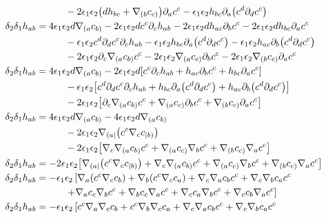 \begin{align*}
    &\quad\quad\quad-2\epsilon_1\epsilon_2\qty(dh_{bc}+\nabla_{(b}c_{c)})\partial_ac^c-\epsilon_1\epsilon_2h_{bc}\partial_a\qty(c^d\partial_dc^c)\\
    \delta_2\delta_1 h_{ab}&=4\epsilon_1 \epsilon_2d\nabla_{(a}c_{b)}-2\epsilon_1\epsilon_2dc^c\partial_ch_{ab}-2\epsilon_1\epsilon_2dh_{ac}\partial_bc^c-2\epsilon_1\epsilon_2dh_{bc}\partial_ac^c\\
    &\quad\quad\quad-\epsilon_1\epsilon_2c^d\partial_dc^c\partial_ch_{ab}-\epsilon_1\epsilon_2h_{bc}\partial_a\qty(c^d\partial_dc^c)-\epsilon_1\epsilon_2h_{ac}\partial_b\qty(c^d\partial_dc^c)\\
    &\quad\quad\quad-2\epsilon_1\epsilon_2\partial_c\nabla_{(a}c_{b)}c^c-2\epsilon_1\epsilon_2\nabla_{(a}c_{c)}\partial_bc^c-2\epsilon_1\epsilon_2\nabla_{(b}c_{c)}\partial_ac^c\\
    \delta_2\delta_1 h_{ab}&=4\epsilon_1 \epsilon_2d\nabla_{(a}c_{b)}-2\epsilon_1\epsilon_2d\qty[c^c\partial_ch_{ab}+h_{ac}\partial_bc^c+h_{bc}\partial_ac^c]\\
    &\quad\quad\quad-\epsilon_1\epsilon_2\qty[c^d\partial_dc^c\partial_ch_{ab}+h_{bc}\partial_a\qty(c^d\partial_dc^c)+h_{ac}\partial_b\qty(c^d\partial_dc^c)]\\
    &\quad\quad\quad-2\epsilon_1\epsilon_2\qty[\partial_c\nabla_{(a}c_{b)}c^c+\nabla_{(a}c_{c)}\partial_bc^c+\nabla_{(b}c_{c)}\partial_ac^c]\\
    \delta_2\delta_1 h_{ab}&=4\epsilon_1 \epsilon_2d\nabla_{(a}c_{b)}-4\epsilon_1\epsilon_2d\nabla_{(a}c_{b)}\\
    &\quad\quad\quad-2\epsilon_1\epsilon_2\nabla_{(a|}\qty(c^c\nabla_cc_{|b)})\\
    &\quad\quad\quad-2\epsilon_1\epsilon_2\qty[\nabla_c\nabla_{(a}c_{b)}c^c+\nabla_{(a}c_{c)}\nabla_bc^c+\nabla_{(b}c_{c)}\nabla_ac^c]\\
    \delta_2\delta_1 h_{ab}&=-2\epsilon_1\epsilon_2\qty[\nabla_{(a|}\qty(c^c\nabla_cc_{|b)})+\nabla_c\nabla_{(a}c_{b)}c^c+\nabla_{(a}c_{c)}\nabla_bc^c+\nabla_{(b}c_{c)}\nabla_ac^c]\\
    \delta_2\delta_1 h_{ab}&=-\epsilon_1\epsilon_2\left[\nabla_{a}\qty(c^c\nabla_cc_{b})+\nabla_{b}\qty(c^c\nabla_cc_{a})+\nabla_c\nabla_{a}c_{b}c^c+\nabla_c\nabla_{b}c_{a}c^c\right.\\
    &\quad\quad\quad\left.+\nabla_{a}c_{c}\nabla_bc^c+\nabla_{b}c_{c}\nabla_ac^c+\nabla_{c}c_{a}\nabla_bc^c+\nabla_{c}c_{b}\nabla_ac^c\right]\\
    \delta_2\delta_1 h_{ab}&=-\epsilon_1\epsilon_2\left[c^c\nabla_{a}\nabla_cc_{b}+c^c\nabla_{b}\nabla_cc_{a}+\nabla_c\nabla_{a}c_{b}c^c+\nabla_c\nabla_{b}c_{a}c^c\right.\\

\end{align*}
